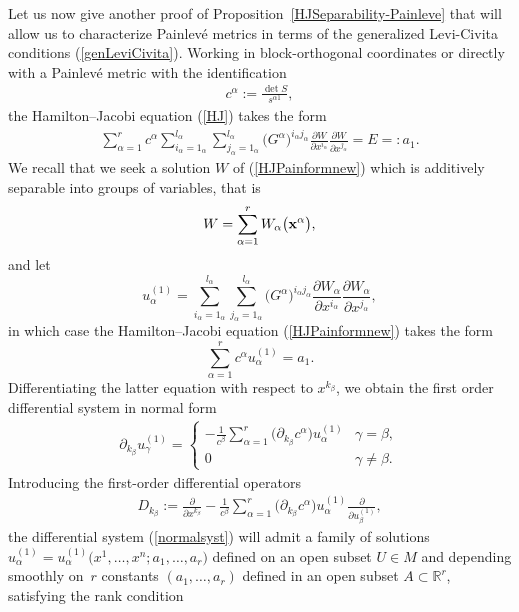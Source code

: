 \documentclass[11pt]{article}
\numberwithin{equation}{section}
\newcommand{\ialpha}{i_{\alpha}}
\newcommand{\jalpha}{j_{\alpha}}
\newcommand{\kbeta}{k_{\beta}}
\newcommand{\lalpha}{l_{\alpha}}
\begin{document}
Let us now give another proof of Proposition~\ref{HJSeparability-Painleve} that will allow us to characterize Painlev\'e metrics in terms of the generalized Levi-Civita conditions (\ref{genLeviCivita}). Working in block-orthogonal coordinates or directly with a Painlev\'e metric with the identification
\begin{gather}\label{not}
c^\alpha:=\frac{\det S}{s^{\alpha 1}},
\end{gather}
the Hamilton--Jacobi equation (\ref{HJ}) takes the form
\begin{gather}\label{HJPainformnew}
\sum_{\alpha =1}^{r} c^\alpha \sum_{\ialpha =1_{\alpha}}^{\lalpha}\sum_{\jalpha =1_{\alpha}}^{\lalpha} \big(G^{\alpha}\big)^{\ialpha \jalpha}\frac{\partial W}{\partial x^{\ialpha} }\frac{\partial W}{\partial x^{\jalpha}}=E=:a_{1}.
\end{gather}
We recall that we seek a solution $W$ of (\ref{HJPainformnew}) which is additively separable into groups of variables, that is
\[
W=\sum_{\alpha =1}^{r}W_{\alpha}\big({\bf x}^{\alpha}\big),
\]
and let
\[
u_{\alpha}^{(1)}=\sum_{\ialpha =1_{\alpha}}^{\lalpha}\sum_{\jalpha =1_{\alpha}}^{\lalpha}\big(G^{\alpha}\big)^{\ialpha \jalpha}\frac{\partial W_{\alpha}}{\partial x^{\ialpha} }\frac{\partial W_{\alpha}}{\partial x^{\jalpha}},
\]
in which case the Hamilton--Jacobi equation (\ref{HJPainformnew}) takes the form
\[
\sum_{\alpha =1}^{r}c^{\alpha}u_{\alpha}^{(1)}=a_{1}.
\]
Differentiating the latter equation with respect to $x^{\kbeta}$, we obtain the first order differential system in normal form
\begin{gather}\label{normalsyst}
 \partial_{\kbeta}u^{(1)}_{\gamma} =   \begin{cases}\displaystyle -\frac{1}{c^{\beta}}\sum_{\alpha =1}^{r}\big(\partial_{\kbeta} c^{\alpha}\big) u^{(1)}_{\alpha} & \gamma = \beta, \\
 0 & \gamma \neq \beta . \end{cases}
\end{gather}
Introducing the first-order differential operators
\begin{gather}\label{totaldiff}
D_{\kbeta} := \frac{\partial}{\partial x^{\kbeta}}-\frac{1}{c^{\beta}}\sum_{\alpha =1}^{r}\big(\partial_{\kbeta} c^{\alpha}\big) u^{(1)}_{\alpha}\frac{\partial}{\partial u^{(1)}_{\beta}},
\end{gather}
the differential system (\ref{normalsyst}) will admit a family of solutions $u^{(1)}_{\alpha}=u^{(1)}_{\alpha}\big(x^{1},\dots,x^{n};a_{1},\dots,a_{r}\big)$ defined on an open subset $U\in M$ and depending smoothly on~$r$ constants $(a_{1},\dots,a_{r})$ defined in an open subset $A\subset {\mathbb{R}}^{r}$, satisfying the rank condition
\end{document}
